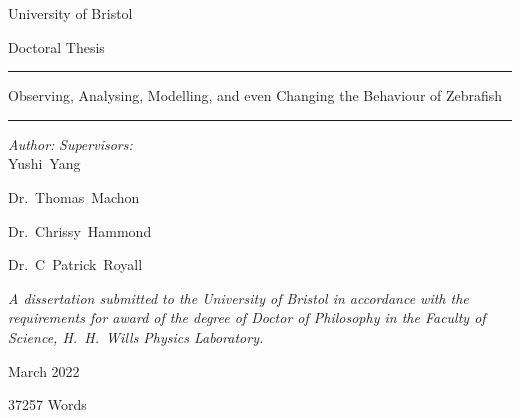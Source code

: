 \documentclass[11pt,twoside]{report}
\begin{document}

\thispagestyle{empty}
\begin{center}
  \begin{minipage}{0.8\linewidth}
    \centering
    \vspace{3cm}
    {\Large \sc University of Bristol \par}
    \vspace{2cm}
    {\Large \sc Doctoral Thesis \par}
    \vspace{1cm}
    \rule{\textwidth}{0.4pt} \par
    {\LARGE \sc \color{bristolred} 
    Observing, Analysing, Modelling, and even Changing the Behaviour of Zebrafish
    \par}
    \rule{\textwidth}{0.4pt} \par

    \vspace{2cm}
    {\large \it Author:}
    \hfill
    {\large \it Supervisors:} \\
    {\sc \large Yushi~Yang}
    \hfill {\sc \large Dr.~Thomas~Machon\par}
    \hfill {\sc \large Dr.~Chrissy~Hammond\par}
    \hfill {\sc \large Dr.~C~Patrick~Royall\par}
    \vspace{3.5cm}
   {\large \it A dissertation submitted to the University of Bristol in accordance with the requirements for award of the degree of Doctor of Philosophy in the Faculty of Science, H.\ H.\ Wills Physics Laboratory. \par}
    \vspace{1em}
    {\large March 2022 \par}
  \end{minipage}
  \mbox{}
  \vfill
  \begin{minipage}{0.8\linewidth}
    \raggedleft
    {\large 37257 Words}
  \end{minipage}
\end{center}


\cleardoublepage

\cleardoublepage

{
	\hypersetup{linkcolor=black}
	\tableofcontents

	\cleardoublepage
	\listoffigures
	
	\cleardoublepage\listoftables
	
	\listofalgorithms

}
\end{document}
